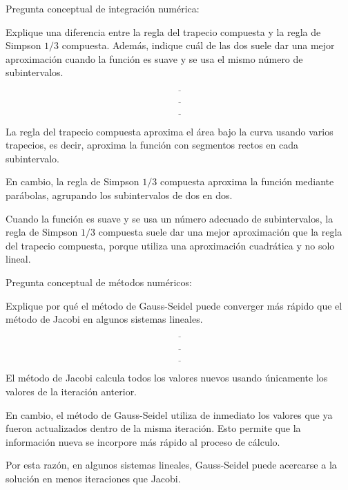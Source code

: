 \documentclass[11pt,respuestas,a4]{aleph-examen}
\begin{document}
\begin{preguntas}

\item
Pregunta conceptual de integración numérica: 

Explique una diferencia entre la regla del trapecio compuesta y la regla de Simpson $1/3$ compuesta. Además, indique cuál de las dos suele dar una mejor aproximación cuando la función es suave y se usa el mismo número de subintervalos.

\[
\underline{\hspace{14cm}}
\]

\[
\underline{\hspace{14cm}}
\]

\[
\underline{\hspace{14cm}}
\]

\begin{respuesta}
La regla del trapecio compuesta aproxima el área bajo la curva usando varios trapecios, es decir, aproxima la función con segmentos rectos en cada subintervalo.

En cambio, la regla de Simpson $1/3$ compuesta aproxima la función mediante parábolas, agrupando los subintervalos de dos en dos.

Cuando la función es suave y se usa un número adecuado de subintervalos, la regla de Simpson $1/3$ compuesta suele dar una mejor aproximación que la regla del trapecio compuesta, porque utiliza una aproximación cuadrática y no solo lineal.
\end{respuesta}


\item
Pregunta conceptual de métodos numéricos: 

Explique por qué el método de Gauss-Seidel puede converger más rápido que el método de Jacobi en algunos sistemas lineales.

\[
\underline{\hspace{14cm}}
\]

\[
\underline{\hspace{14cm}}
\]

\[
\underline{\hspace{14cm}}
\]

\begin{respuesta}
El método de Jacobi calcula todos los valores nuevos usando únicamente los valores de la iteración anterior.

En cambio, el método de Gauss-Seidel utiliza de inmediato los valores que ya fueron actualizados dentro de la misma iteración. Esto permite que la información nueva se incorpore más rápido al proceso de cálculo.

Por esta razón, en algunos sistemas lineales, Gauss-Seidel puede acercarse a la solución en menos iteraciones que Jacobi.
\end{respuesta}

\end{preguntas}
\end{document}
